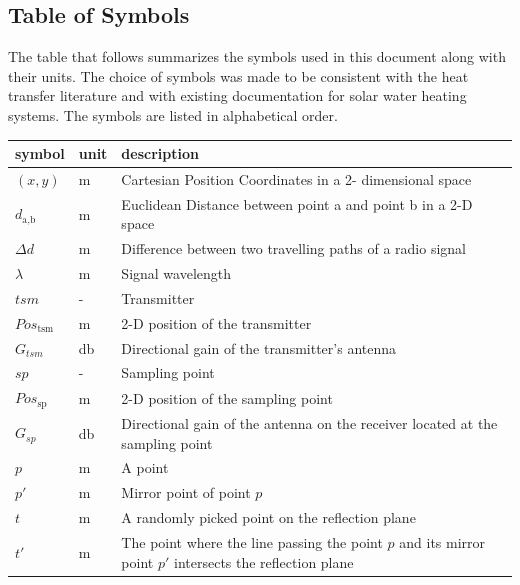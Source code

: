 \documentclass[12pt]{article}
\begin{document}
\subsection{Table of Symbols}

The table that follows summarizes the symbols used in this document along with
their units.  The choice of symbols was made to be consistent with the heat
transfer literature and with existing documentation for solar water heating
systems.  The symbols are listed in alphabetical order.

\renewcommand{\arraystretch}{1.2}
\noindent \begin{longtable*}{l l p{12cm}} \toprule
\textbf{symbol} & \textbf{unit} & \textbf{description}\\
\midrule 
$(x,y)$ & \si[per-mode=symbol] {\metre} & Cartesian Position Coordinates in a 2-
dimensional space
\\
$d_\text{a,b}$ & \si[per-mode=symbol] {\metre} & Euclidean Distance between point 
a and point b in a 2-D space
\\
$\Delta d$ & \si[per-mode=symbol] {\metre} & Difference between two travelling 
paths of a radio signal
\\
$\lambda$ & \si[per-mode=symbol] {\metre} & Signal wavelength
\\
$tsm$ & \si[per-mode=symbol] {-} & Transmitter
\\
$Pos_\text{tsm}$ & \si[per-mode=symbol] {\metre} & 2-D position of the transmitter 
\\
$G_{tsm}$ & \si[per-mode=symbol] {\decibel} & Directional gain of the transmitter's 
antenna 
\\
$sp$ & \si[per-mode=symbol] {-} & Sampling point
\\
$Pos_\text{sp}$ & \si[per-mode=symbol] {\metre} & 2-D position of the sampling 
point 
\\
$G_{sp}$ & \si[per-mode=symbol] {\decibel} & Directional gain of the antenna on 
the receiver located at the sampling point
\\
$p$ & \si[per-mode=symbol] {m} & A point
\\
$p'$ & \si[per-mode=symbol] {m} & Mirror point of point $p$
\\
$t$ & \si[per-mode=symbol] {m} & A randomly picked point on the reflection plane
\\
$t'$ & \si[per-mode=symbol] {m} & The point where the line passing the point $p$
and its mirror point $p'$ intersects the reflection plane

\end{longtable*}
\end{document}

